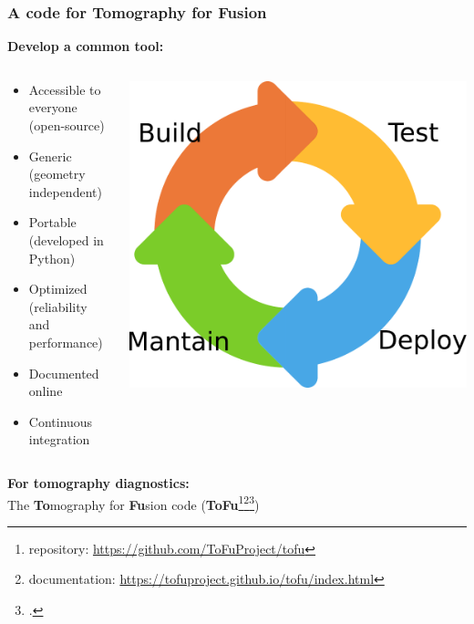 \documentclass[10pt]{beamer}
\begin{document}
\begin{frame}
\frametitle{A code for Tomography for Fusion}
\textbf{Develop a common tool:}
\begin{columns}
\begin{column}{0.65\textwidth}
	\begin{itemize}
	\item Accessible to everyone (open-source)
	\item Generic (geometry independent)
	\item Portable (developed in Python)
	\item Optimized (reliability and performance)
	\item Documented online
	\item Continuous integration
	\end{itemize}
\end{column}
\begin{column}{0.35\textwidth}
\vspace{-1cm}
\begin{center}
    	\includegraphics[width=0.8\linewidth]{figures/ci.pdf}
\end{center}
\end{column}
\end{columns}
\vspace{-0.9cm}

\begin{block}{}
	\begin{center}
	\textbf{For tomography diagnostics:\\ } The \alert{\textbf{To}mography for \textbf{Fu}sion} code (\alert{\textbf{ToFu}\footnote{repository: \url{https://github.com/ToFuProject/tofu}}\footnote{documentation: \url{https://tofuproject.github.io/tofu/index.html} }\footcite{didier2016}})
	\end{center}
\vspace{-5mm} 
\end{block}
	
\end{frame}
\end{document}
